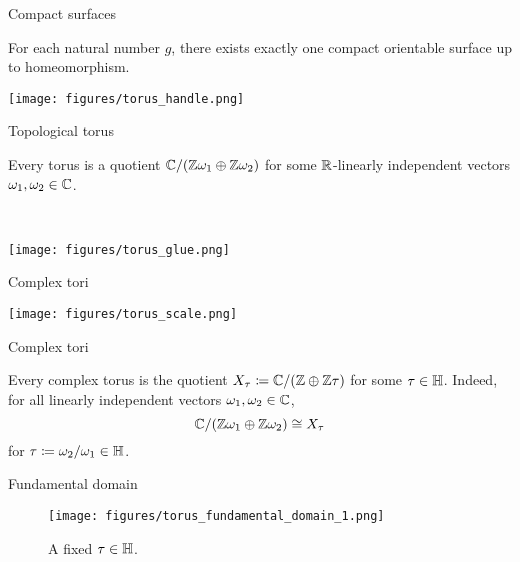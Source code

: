 \documentclass{beamer}
\begin{document}
    \begin{frame}{Compact surfaces}
        \begin{theorem}
            For each natural number $g$, there exists exactly one compact orientable surface up to homeomorphism.
        \end{theorem}

        \pause

        \begin{center}
            \texttt{[image: figures/torus\_handle.png]}
        \end{center}
    \end{frame}
    \begin{frame}{Topological torus}
        \begin{theorem}
            Every torus is a quotient $\mathbb{C}/\!\left(\mathbb{Z}\omega_1\oplus\mathbb{Z}\omega_2\right)$ for some $\mathbb{R}$-linearly independent vectors $\omega_1,\omega_2\in\mathbb{C}$.
        \end{theorem}

        \pause\ \\

        \begin{center}
            \texttt{[image: figures/torus\_glue.png]}
        \end{center}
    \end{frame}
    \begin{frame}{Complex tori}
        \begin{center}
            \texttt{[image: figures/torus\_scale.png]}
        \end{center}
    \end{frame}
    \begin{frame}{Complex tori}
        \begin{theorem}
            Every complex torus is the quotient $X_\tau\coloneqq\mathbb{C}/\!\left(\mathbb{Z}\oplus\mathbb{Z}\tau\right)$ for some $\tau\in\mathbb{H}$. Indeed, for all linearly independent vectors $\omega_1,\omega_2\in\mathbb{C}$,
            \begin{equation*}
                \mathbb{C}/\!\left(\mathbb{Z}\omega_1\oplus\mathbb{Z}\omega_2\right)\cong X_\tau
            \end{equation*}
            for $\tau\coloneqq\omega_2/\omega_1\in\mathbb{H}$.
        \end{theorem}
    \end{frame}
    \begin{frame}{Fundamental domain}
        \begin{figure}
            \texttt{[image: figures/torus\_fundamental\_domain\_1.png]}
            \caption{A fixed $\tau\in\mathbb{H}$.}
        \end{figure}
    \end{frame}
\end{document}

